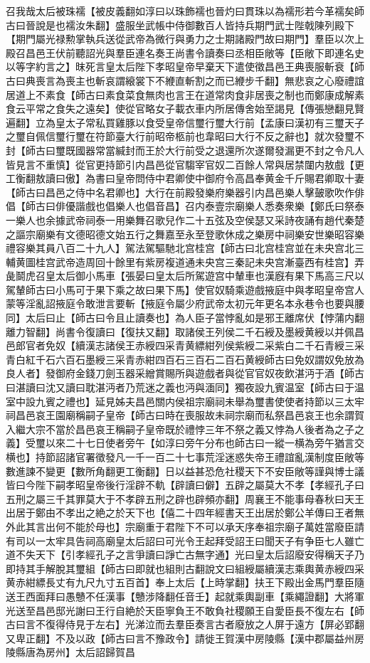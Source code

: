 召我哉太后被珠襦【被皮義翻如淳曰以珠飾襦也晉灼曰貫珠以為襦形若今革襦矣師古曰晉說是也襦汝朱翻】盛服坐武帳中侍御數百人皆持兵期門武士陛戟陳列殿下【期門屬光禄勲掌執兵送從武帝為微行與勇力之士期諸殿門故曰期門】羣臣以次上殿召昌邑王伏前聽詔光與羣臣連名奏王尚書令讀奏曰丞相臣敞等【臣敞下即連名史以等字約言之】昩死言皇太后陛下孝昭皇帝早棄天下遣使徵昌邑王典喪服斬衰【師古曰典喪言為喪主也斬哀謂縗裳下不緶直斬割之而已緶步千翻】無悲哀之心廢禮誼居道上不素食【師古曰素食菜食無肉也言王在道常肉食非居喪之制也而鄭康成解素食云平常之食失之遠矣】使從官略女子載衣車内所居傳舍始至謁見【傳張戀翻見賢遍翻】立為皇太子常私買雞豚以食受皇帝信璽行璽大行前【孟康曰漢初有三璽天子之璽自佩信璽行璽在符節臺大行前昭帝柩前也韋昭曰大行不反之辭也】就次發璽不封【師古曰璽既國器常當緘封而王於大行前受之退還所次遂爾發漏更不封之令凡人皆見言不重慎】從官更持節引内昌邑從官騶宰官奴二百餘人常與居禁闥内敖戲【更工衡翻敖讀曰傲】為書曰皇帝問侍中君卿使中御府令高昌奉黄金千斤賜君卿取十妻【師古曰昌邑之侍中名君卿也】大行在前殿發樂府樂器引内昌邑樂人擊皷歌吹作俳倡【師古曰俳優諧戲也倡樂人也倡音昌】召内泰壹宗廟樂人悉奏衆樂【鄭氏曰祭泰一樂人也余據武帝祠泰一用樂舞召歌兒作二十五弦及空侯瑟又采詩夜誦有趙代秦楚之謳宗廟樂有文德昭德文始五行之舞嘉至永至登歌休成之樂房中祠樂安世樂昭容樂禮容樂其員八百二十九人】駕法駕驅馳北宫桂宫【師古曰北宫桂宫並在未央宫北三輔黄圖桂宫武帝造周回十餘里有紫房複道通未央宫三秦記未央宫漸臺西有桂宫】弄彘鬬虎召皇太后御小馬車【張晏曰皇太后所駕遊宫中輦車也漢廐有果下馬高三尺以駕輦師古曰小馬可于果下乘之故曰果下馬】使官奴騎乘遊戲掖庭中與孝昭皇帝宫人蒙等淫亂詔掖庭令敢泄言要斬【掖庭令屬少府武帝太初元年更名本永巷令也要與腰同】太后曰止【師古曰令且止讀奏也】為人臣子當悖亂如是邪王離席伏【悖蒲内翻離力智翻】尚書令復讀曰【復扶又翻】取諸侯王列侯二千石綬及墨綬黄綬以并佩昌邑郎官者免奴【續漢志諸侯王赤綬四采青黄縹紺列侯紫綬二采紫白二千石青綬三采青白紅千石六百石墨綬三采青赤紺四百石三百石二百石黄綬師古曰免奴謂奴免放為良人者】發御府金錢刀劍玉器采繒賞賜所與遊戲者與從官官奴夜飲湛沔于酒【師古曰湛讀曰沈又讀曰耽湛沔者乃荒迷之義也沔與湎同】獨夜設九賓温室【師古曰于温室中設九賓之禮也】延見姊夫昌邑關内侯祖宗廟祠未舉為璽書使使者持節以三太牢祠昌邑哀王園廟稱嗣子皇帝【師古曰時在喪服故未祠宗廟而私祭昌邑哀王也余謂賀入繼大宗不當於昌邑哀王稱嗣子皇帝既於禮悖三年不祭之義又悖為人後者為之子之義】受璽以來二十七日使者旁午【如淳曰旁午分布也師古曰一縱一横為旁午猶言交横也】持節詔諸官署徵發凡一千一百二十七事荒淫迷惑失帝王禮誼亂漢制度臣敞等數進諫不變更【數所角翻更工衡翻】日以益甚恐危社稷天下不安臣敞等謹與博士議皆曰今陛下嗣孝昭皇帝後行淫辟不軌【辟讀曰僻】五辟之屬莫大不孝【孝經孔子曰五刑之屬三千其罪莫大于不孝辟五刑之辟也辟頻亦翻】周襄王不能事母春秋曰天王出居于鄭由不孝出之絶之於天下也【僖二十四年經書天王出居於鄭公羊傳曰王者無外此其言出何不能於母也】宗廟重于君陛下不可以承天序奉祖宗廟子萬姓當廢臣請有司以一太牢具告祠高廟皇太后詔曰可光令王起拜受詔王曰聞天子有争臣七人雖亡道不失天下【引孝經孔子之言爭讀曰諍亡古無字通】光曰皇太后詔廢安得稱天子乃即持其手解脫其璽組【師古曰即就也組則古翻說文曰組綬屬續漢志乘輿黄赤綬四采黄赤紺縹長丈有九尺九寸五百首】奉上太后【上時掌翻】扶王下殿出金馬門羣臣隨送王西面拜曰愚戇不任漢事【戇涉降翻任音壬】起就乘輿副車【乘繩證翻】大將軍光送至昌邑邸光謝曰王行自絶於天臣寧負王不敢負社稷願王自愛臣長不復左右【師古曰言不復得侍見于左右】光涕泣而去羣臣奏言古者廢放之人屏于遠方【屏必郢翻又卑正翻】不及以政【師古曰言不豫政令】請徙王賀漢中房陵縣【漢中郡屬益州房陵縣唐為房州】太后詔歸賀昌
